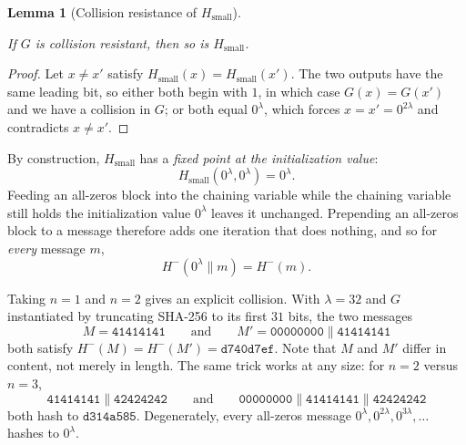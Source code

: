 \documentclass[
  letterpaper,
]{scrbook}
\theoremstyle{definition}
\theoremstyle{plain}
\newtheorem{lemma}{Lemma}[chapter]
\theoremstyle{plain}
\theoremstyle{remark}
\begin{document}
\begin{lemma}[Collision resistance of
\(H_\text{small}\)]\protect\hypertarget{lem-hsmall-cr}{}\label{lem-hsmall-cr}

If \(G\) is collision resistant, then so is \(H_\text{small}\).

\end{lemma}

\begin{proof}
Let \(x \neq x'\) satisfy \(H_\text{small}(x) = H_\text{small}(x')\).
The two outputs have the same leading bit, so either both begin with
\(1\), in which case \(G(x) = G(x')\) and we have a collision in \(G\);
or both equal \(0^{\lambda}\), which forces \(x = x' = 0^{2\lambda}\)
and contradicts \(x \neq x'\).
\end{proof}


By construction, \(H_\text{small}\) has a \emph{fixed point at the
initialization value}:
\[ H_\text{small}(0^{\lambda}, 0^{\lambda}) = 0^{\lambda}. \] Feeding an
all-zeros block into the chaining variable while the chaining variable
still holds the initialization value \(0^{\lambda}\) leaves it
unchanged. Prepending an all-zeros block to a message therefore adds one
iteration that does nothing, and so for \emph{every} message \(m\),
\[ H^-(0^{\lambda} \| m) = H^-(m). \]

Taking \(n = 1\) and \(n = 2\) gives an explicit collision. With
\(\lambda = 32\) and \(G\) instantiated by truncating SHA-256 to its
first \(31\) bits, the two messages
\[ M = \texttt{41414141} \qquad\text{and}\qquad M' = \texttt{00000000} \| \texttt{41414141} \]
both satisfy \(H^-(M) = H^-(M') = \texttt{d740d7ef}\). Note that \(M\)
and \(M'\) differ in content, not merely in length. The same trick works
at any size: for \(n = 2\) versus \(n = 3\),
\[ \texttt{41414141} \| \texttt{42424242} \qquad\text{and}\qquad \texttt{00000000} \| \texttt{41414141} \| \texttt{42424242} \]
both hash to \(\texttt{d314a585}\). Degenerately, every all-zeros
message \(0^{\lambda}, 0^{2\lambda}, 0^{3\lambda}, \dots\) hashes to
\(0^{\lambda}\).
\end{document}
